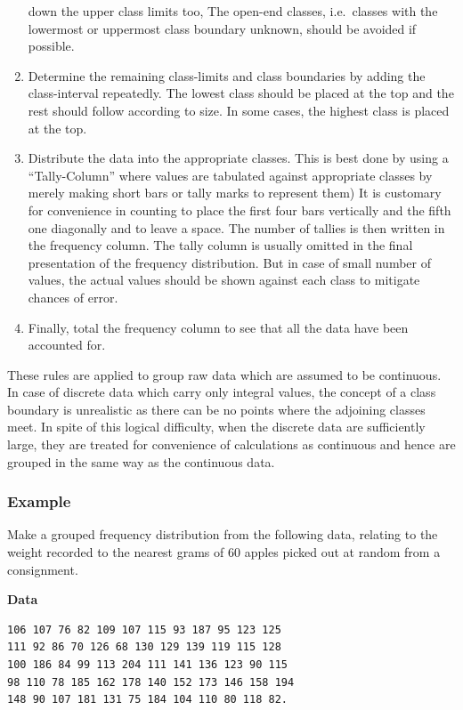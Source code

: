 \documentclass[]{article}
\begin{document}
\begin{enumerate}
  down the upper class limits too, The open-end classes, i.e.~classes
  with the lowermost or uppermost class boundary unknown, should be
  avoided if possible.
\item
  Determine the remaining class-limits and class boundaries by adding
  the class-interval repeatedly. The lowest class should be placed at
  the top and the rest should follow according to size. In some cases,
  the highest class is placed at the top.
\item
  Distribute the data into the appropriate classes. This is best done by
  using a ``Tally-Column'' where values are tabulated against
  appropriate classes by merely making short bars or tally marks to
  represent them) It is customary for convenience in counting to place
  the first four bars vertically and the fifth one diagonally and to
  leave a space. The number of tallies is then written in the frequency
  column. The tally column is usually omitted in the final presentation
  of the frequency distribution. But in case of small number of values,
  the actual values should be shown against each class to mitigate
  chances of error.
\item
  Finally, total the frequency column to see that all the data have been
  accounted for.
\end{enumerate}

These rules are applied to group raw data which are assumed to be
continuous. In case of discrete data which carry only integral values,
the concept of a class boundary is unrealistic as there can be no points
where the adjoining classes meet. In spite of this logical difficulty,
when the discrete data are sufficiently large, they are treated for
convenience of calculations as continuous and hence are grouped in the
same way as the continuous data.

\hypertarget{example}{%
\subsubsection{Example}\label{example}}

Make a grouped frequency distribution from the following data, relating
to the weight recorded to the nearest grams of 60 apples picked out at
random from a consignment.

\textbf{Data}

\hypertarget{data}{%
\label{data}}%
\begin{verbatim}
106 107 76 82 109 107 115 93 187 95 123 125 
111 92 86 70 126 68 130 129 139 119 115 128 
100 186 84 99 113 204 111 141 136 123 90 115 
98 110 78 185 162 178 140 152 173 146 158 194
148 90 107 181 131 75 184 104 110 80 118 82.
\end{verbatim}
\end{document}
